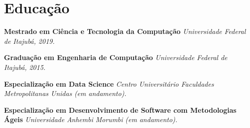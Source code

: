 \documentclass[]{cv-style}          %
\begin{document}

\section{Educação}
\vspace{-0.3cm}
\begin{entrylist}
\entry
{}
{\textbf{Mestrado em Ciência e Tecnologia da Computação}}
{}
{\textit{ Universidade Federal de Itajubá, 2019.}}
{}

\entry
{}
{\textbf{Graduação em Engenharia de Computação }}
{}
{\textit{ Universidade Federal de Itajubá, 2015.}}
{}

\entry
{}
{\textbf{Especialização em Data Science}}
{}
{\textit{Centro Universitário Faculdades Metropolitanas Unidas (em andamento).}}
{}

\entry
{}
{\textbf{Especialização em Desenvolvimento de Software com Metodologias Ágeis}}
{}
{\textit{Universidade Anhembi Morumbi (em andamento).}}
{}

\end{entrylist}
{\vspace{-0.8cm}}
\end{document}
